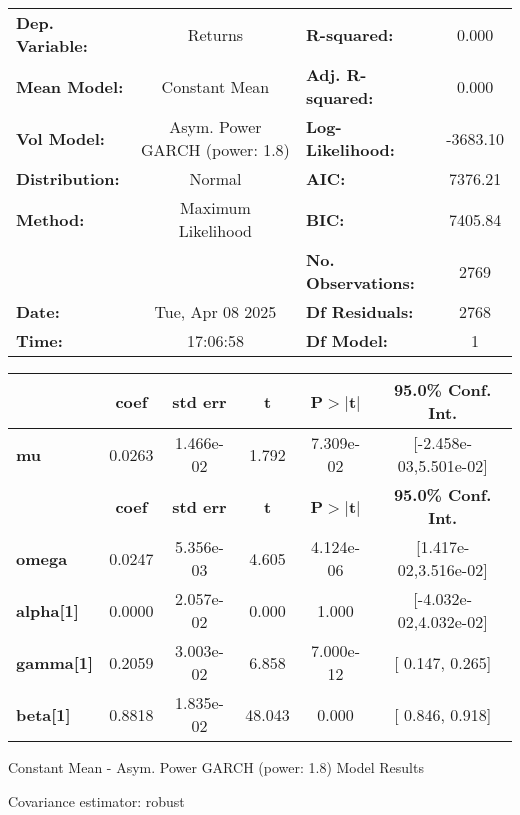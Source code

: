 \begin{center}
\begin{tabular}{lclc}
\toprule
\textbf{Dep. Variable:} &            Returns             & \textbf{  R-squared:         } &     0.000   \\
\textbf{Mean Model:}    &         Constant Mean          & \textbf{  Adj. R-squared:    } &     0.000   \\
\textbf{Vol Model:}     & Asym. Power GARCH (power: 1.8) & \textbf{  Log-Likelihood:    } &   -3683.10  \\
\textbf{Distribution:}  &             Normal             & \textbf{  AIC:               } &    7376.21  \\
\textbf{Method:}        &       Maximum Likelihood       & \textbf{  BIC:               } &    7405.84  \\
\textbf{}               &                                & \textbf{  No. Observations:  } &    2769     \\
\textbf{Date:}          &        Tue, Apr 08 2025        & \textbf{  Df Residuals:      } &    2768     \\
\textbf{Time:}          &            17:06:58            & \textbf{  Df Model:          } &     1       \\
\bottomrule
\end{tabular}
\begin{tabular}{lccccc}
            & \textbf{coef} & \textbf{std err} & \textbf{t} & \textbf{P$> |$t$|$} & \textbf{95.0\% Conf. Int.}  \\
\midrule
\textbf{mu} &       0.0263  &    1.466e-02     &     1.792  &      7.309e-02       &   [-2.458e-03,5.501e-02]    \\
                  & \textbf{coef} & \textbf{std err} & \textbf{t} & \textbf{P$> |$t$|$} & \textbf{95.0\% Conf. Int.}  \\
\midrule
\textbf{omega}    &       0.0247  &    5.356e-03     &     4.605  &      4.124e-06       &   [1.417e-02,3.516e-02]     \\
\textbf{alpha[1]} &     0.0000    &    2.057e-02     &   0.000    &          1.000       &   [-4.032e-02,4.032e-02]    \\
\textbf{gamma[1]} &       0.2059  &    3.003e-02     &     6.858  &      7.000e-12       &     [  0.147,  0.265]       \\
\textbf{beta[1]}  &       0.8818  &    1.835e-02     &    48.043  &        0.000         &     [  0.846,  0.918]       \\
\bottomrule
\end{tabular}
\caption{Constant Mean - Asym. Power GARCH (power: 1.8) Model Results}
\end{center}

Covariance estimator: robust